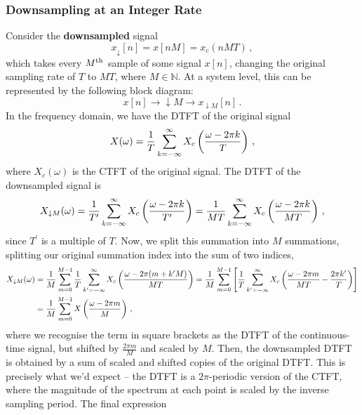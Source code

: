 \subsubsection{Downsampling at an Integer Rate}
%
Consider the \textbf{downsampled} signal
%
\begin{displaymath}
  x_\downarrow[n] = x[nM] = x_c(nMT) \,,
\end{displaymath}
%
which takes every $M^\mathrm{th}\mkern1mu$ sample of some signal $x[n]$, changing the original sampling
rate of $T$ to $MT$, where $M\in\mathbb{N}$. At a system level, this can be represented
by the following block diagram:
%
\begin{displaymath}
  x[n] \longrightarrow \boxed{\downarrow M} \longrightarrow x_{\downarrow M}[n] \,.
\end{displaymath}
%
In the frequency domain, we have the DTFT of the original signal
%
\begin{displaymath}
  X(\omega) = \frac{1}{T}\sum_{k=-\infty}^\infty X_c\left(\frac{\omega - 2\pi k}{T}\right) \,,
\end{displaymath}
%
where $X_c(\omega)$ is the CTFT of the original signal. The DTFT of the
downsampled signal is
%
\begin{displaymath}
  X_{\downarrow M}(\omega) = \frac{1}{T^\prime}\sum_{k=-\infty}^\infty X_c\left(\frac{\omega - 2\pi k}{T^\prime}\right)
  = \frac{1}{MT}\sum_{k=-\infty}^\infty X_c\left(\frac{\omega - 2\pi k}{MT}\right) \,,
\end{displaymath}
%
since $T^\prime$ is a multiple of $T$. Now, we split this summation into $M$ summations,
splitting our original summation index into the sum of two indices,
%
\begin{align*}
  X_{\downarrow M}(\omega) &= \frac{1}{M}\sum_{m=0}^{M-1}\frac{1}{T}\sum_{k^\prime=-\infty}^\infty
  X_c\left(\frac{\omega - 2\pi(m + k^\prime M)}{MT}\right)
  = \frac{1}{M}\sum_{m=0}^{M-1}\left[\frac{1}{T}\sum_{k^\prime=-\infty}^\infty X_c\left(
    \frac{\omega-2\pi m}{MT} - \frac{2\pi k^\prime}{T}
    \right)\right] \\
  &= \frac{1}{M}\sum_{m=0}^{M-1}X\left(\frac{\omega - 2\pi m}{M}\right)
  \,,
\end{align*}
%
where we recognise the term in square brackets as the DTFT of the continuous-time signal,
but shifted by $\frac{2\pi m}{M}$ and scaled by $M$. Then, the downsampled DTFT is
obtained by a sum of scaled and shifted copies of the original DTFT. This is precisely
what we'd expect -- the DTFT is a $2\pi$-periodic version of the CTFT, where the magnitude
of the spectrum at each point is scaled by the inverse sampling period. The final expression

